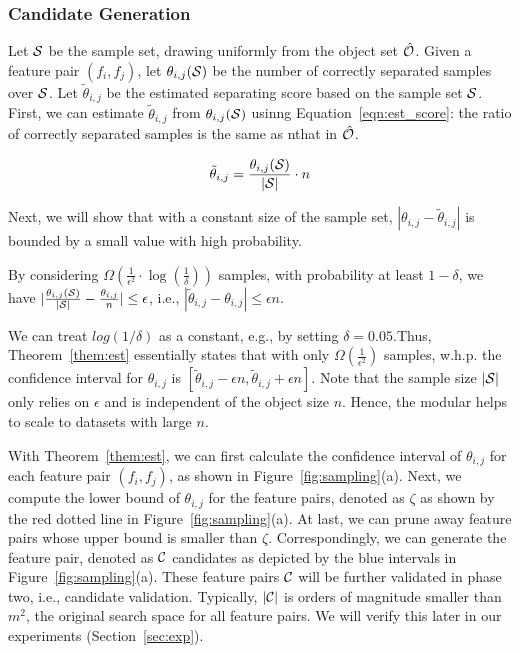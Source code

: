 \subsubsection{Candidate Generation}\label{sssec:generate}
Let $\sss$ be the sample set, drawing uniformly from the object set $\hat{\oo}$. Given a feature pair $(f_i,f_j)$, let $\theta_{i,j}(\sss)$ be the number of correctly separated samples over $\sss$. Let $\tilde{\theta}_{i,j}$ be the estimated separating score based on the sample set $\sss$. First, we can estimate $\tilde{\theta}_{i,j}$ from $\theta_{i,j}(\sss)$ usinng Equation~\ref{eqn:est_score}: the ratio of correctly separated samples is the same as nthat in $\hat{\oo}$. 

\begin{equation}\label{eqn:est_score}
\tilde{\theta}_{i,j} = \frac{\theta_{i,j}(\sss)}{|\sss|} \cdot n
\end{equation}

Next, we will show that with a constant size of the sample set, $|\theta_{i,j}-\tilde{\theta}_{i,j}|$ is bounded by a small value with high probability. 

\begin{theorem}\label{them:est}
By considering $\Omega(\frac{1}{\epsilon^2}\cdot \log(\frac{1}{\delta}))$ samples, with probability at least $1-\delta$, we have $|\frac{\theta_{i,j}(\sss)}{|\sss|}-\frac{\theta_{i,j}}{n}| \leq \epsilon$, i.e., $|\tilde{\theta}_{i,j}-\theta_{i,j}|\leq \epsilon n$.
\end{theorem}

We can treat $log(1/\delta)$ as a constant, e.g., by setting $\delta = 0.05$.Thus, Theorem~\ref{them:est} essentially states that with only $\Omega(\frac{1}{\epsilon^2})$ samples, w.h.p. the confidence interval for $\theta_{i,j}$ is $[\tilde{\theta}_{i,j}-\epsilon n, \tilde{\theta}_{i,j}+\epsilon n]$. Note that the sample size $|\sss|$ only relies on $\epsilon$ and is independent of the object size $n$. Hence, the \sampling modular helps \genviz to scale to datasets with large $n$. 

With Theorem~\ref{them:est}, we can first calculate the confidence interval of $\theta_{i,j}$ for each feature pair $(f_i,f_j)$, as shown in Figure~\ref{fig:sampling}(a). Next, we compute the lower bound of $\theta_{i,j}$ for the \topk feature pairs, denoted as $\zeta$ as shown by the red dotted line in Figure~\ref{fig:sampling}(a). At last, we can prune away feature pairs whose upper bound is smaller than $\zeta$. Correspondingly, we can generate the feature pair, denoted as $\cc$ candidates as depicted by the blue intervals in Figure~\ref{fig:sampling}(a). These feature pairs $\cc$ will be further validated in phase two, i.e., candidate validation. Typically, $|\cc|$ is orders of magnitude smaller than $m^2$, the original search space for all feature pairs. We will verify this later in our experiments (Section~\ref{sec:exp}). 

